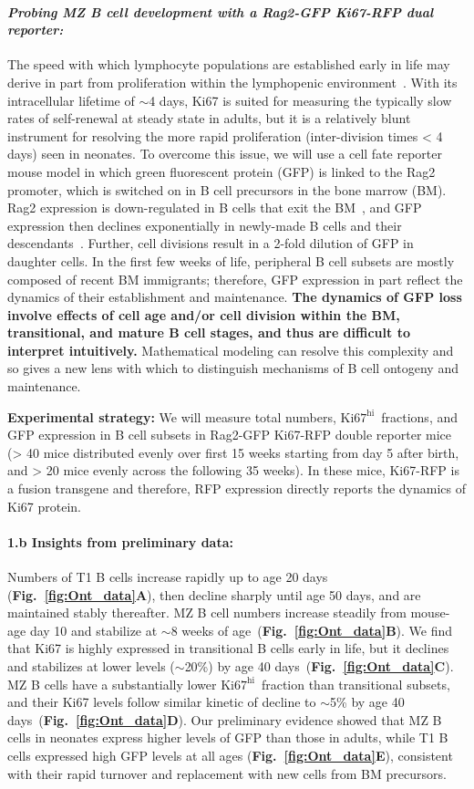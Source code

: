 \documentclass[11pt]{article}
\newcommand{\khi}{\ensuremath{\text{Ki67}^\text{hi}}~}
\newcommand{\para}[1]{\vspace*{-4.5mm}\paragraph{#1}}
\begin{document}
\para{\textit{Probing MZ B cell development with a Rag2-GFP Ki67-RFP dual reporter: }}
The speed with which lymphocyte populations are established early in life may derive in part from proliferation within the lymphopenic environment~\cite{Min_2003}.
With its intracellular lifetime of $\sim$4 days,  Ki67 is suited for measuring the typically slow rates of self-renewal at steady state in adults, but it is a relatively blunt instrument for resolving the more rapid proliferation (inter-division times < 4 days) seen in neonates. 
To overcome this issue, we will use a cell fate reporter mouse model in which green fluorescent protein (GFP) is linked to the Rag2 promoter, which is switched on in B cell precursors in the bone marrow (BM).
Rag2 expression is down-regulated in B cells that exit the BM~\cite{Grawunder_1995}, and GFP expression then declines exponentially in newly-made B cells and  their descendants~\cite{Yu_1999, Monroe_1999}. 
Further, cell divisions result in a 2-fold dilution of GFP in daughter cells. 
In the first few weeks of life, peripheral B cell subsets are mostly composed of recent BM immigrants; therefore, GFP expression in part reflect the dynamics of their establishment and maintenance. 
\textbf{The dynamics of GFP loss involve effects of cell age and/or cell division within the BM, transitional, and mature B cell stages, and thus are difficult to interpret intuitively.}
Mathematical modeling can resolve this complexity and so gives a new lens with which to distinguish mechanisms of B cell ontogeny and maintenance. 

\textbf{Experimental strategy:} 
We will measure total numbers,  \khi fractions, and GFP expression in B cell subsets in Rag2-GFP Ki67-RFP double reporter mice (> 40 mice distributed evenly over first 15 weeks starting from day 5 after birth, and > 20 mice evenly across the following 35 weeks). 
In these mice, Ki67-RFP is a fusion transgene and therefore, RFP expression directly reports the dynamics of Ki67 protein.

\para{{1.b Insights from preliminary data:}}
Numbers of T1 B cells increase rapidly up to age 20 days (\textbf{Fig.~\ref{fig:Ont_data}A}), then decline sharply until age 50 days, and are maintained stably thereafter.
MZ B cell numbers increase steadily from mouse-age day 10 and stabilize at  $\sim$8 weeks of age~(\textbf{Fig.~\ref{fig:Ont_data}B}).
We find that Ki67 is highly expressed in transitional B cells early in life, but it declines and stabilizes at lower levels ($\sim$20\%) by age 40 days~(\textbf{Fig.~\ref{fig:Ont_data}C}).
MZ B cells have a substantially lower \khi fraction than transitional subsets, and their Ki67 levels follow similar kinetic of decline to $\sim$5\% by age 40 days~(\textbf{Fig.~\ref{fig:Ont_data}D}).
Our preliminary evidence showed that MZ B cells in neonates express higher levels of GFP than those in adults, while T1 B cells expressed high GFP levels at all ages (\textbf{Fig.~\ref{fig:Ont_data}E}), consistent with their rapid turnover and replacement with new cells from BM precursors.
\end{document}
